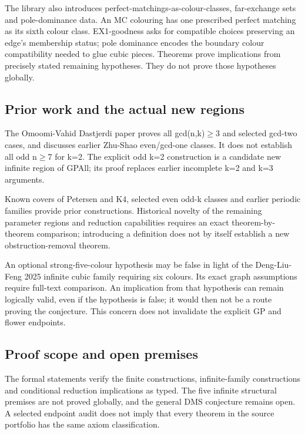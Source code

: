 \documentclass[11pt,a4paper]{article}
\begin{document}
The library also introduces perfect-matchings-as-colour-classes, far-exchange sets and pole-dominance data. An MC colouring has one prescribed perfect matching as its sixth colour class. EX1-goodness asks for compatible choices preserving an edge's membership status; pole dominance encodes the boundary colour compatibility needed to glue cubic pieces. Theorems prove implications from precisely stated remaining hypotheses. They do not prove those hypotheses globally.

\subsection{Prior work and the actual new regions}
The Omoomi-Vahid Dastjerdi paper proves all gcd(n,k)\ensuremath{\geq}3 and selected gcd-two cases, and discusses earlier Zhu-Shao even/gcd-one classes. It does not establish all odd n\ensuremath{\geq}7 for k=2. The explicit odd k=2 construction is a candidate new infinite region of GPAll; its proof replaces earlier incomplete k=2 and k=3 arguments.

\begin{samepage}
Known covers of Petersen and K4, selected even odd-k classes and earlier periodic families provide prior constructions. Historical novelty of the remaining parameter regions and reduction capabilities requires an exact theorem-by-theorem comparison; introducing a definition does not by itself establish a new obstruction-removal theorem.

\end{samepage}
An optional strong-five-colour hypothesis may be false in light of the Deng-Liu-Feng 2025 infinite cubic family requiring six colours. Its exact graph assumptions require full-text comparison. An implication from that hypothesis can remain logically valid, even if the hypothesis is false; it would then not be a route proving the conjecture. This concern does not invalidate the explicit GP and flower endpoints.

\subsection{Proof scope and open premises}
The formal statements verify the finite constructions, infinite-family constructions and conditional reduction implications as typed. The five infinite structural premises are not proved globally, and the general DMS conjecture remains open. A selected endpoint audit does not imply that every theorem in the source portfolio has the same axiom classification.
\end{document}

